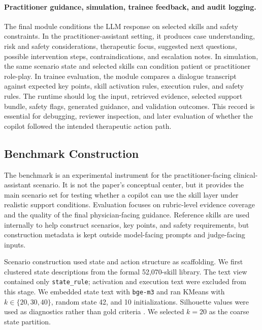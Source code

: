 \documentclass[11pt]{article}
\begin{document}
\paragraph{Practitioner guidance, simulation, trainee feedback, and audit logging.}
The final module conditions the LLM response on selected skills and safety constraints. In the practitioner-assistant setting, it produces case understanding, risk and safety considerations, therapeutic focus, suggested next questions, possible intervention steps, contraindications, and escalation notes. In simulation, the same scenario state and selected skills can condition patient or practitioner role-play. In trainee evaluation, the module compares a dialogue transcript against expected key points, skill activation rules, execution rules, and safety rules. The runtime should log the input, retrieved evidence, selected support bundle, safety flags, generated guidance, and validation outcomes. This record is essential for debugging, reviewer inspection, and later evaluation of whether the copilot followed the intended therapeutic action path.

\subsection{Benchmark Construction}

The benchmark is an experimental instrument for the practitioner-facing clinical-assistant scenario. It is not the paper's conceptual center, but it provides the main scenario set for testing whether a copilot can use the skill layer under realistic support conditions. Evaluation focuses on rubric-level evidence coverage and the quality of the final physician-facing guidance. Reference skills are used internally to help construct scenarios, key points, and safety requirements, but construction metadata is kept outside model-facing prompts and judge-facing inputs.

Scenario construction used state and action structure as scaffolding. We first clustered state descriptions from the formal 52,070-skill library. The text view contained only \texttt{state\_rule}; activation and execution text were excluded from this stage. We embedded state text with \texttt{bge-m3} \citep{chen2024bgem3} and ran KMeans \citep{macqueen1967kmeans} with $k \in \{20,30,40\}$, random state 42, and 10 initializations. Silhouette values were used as diagnostics rather than gold criteria \citep{rousseeuw1987silhouettes}. We selected $k=20$ as the coarse state partition.
\end{document}
